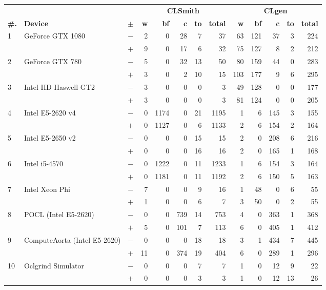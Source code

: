 \begin{tabular}{lll | rrrrr | rrrrr }
  \toprule
  & & & \multicolumn{5}{c|}{\textbf{CLSmith}} & \multicolumn{5}{c}{\textbf{CLgen}} \\
  \textbf{\#.} & \textbf{Device} & $\pm$ &
  \textbf{w} & \textbf{bf} & \textbf{c} & \textbf{to} & \textbf{total} &
  \textbf{w} & \textbf{bf} & \textbf{c} & \textbf{to} & \textbf{total} \\
  \midrule
  \multirow{ 2}{*}{1} & \multirow{ 2}{*}{GeForce GTX 1080} & $-$ & 2 & 0 & 28 & 7 & 37       & 63 & 121 & 37 & 3 & 224 \\& & $+$ & 9 & 0 & 17 & 6 & 32 & 75 & 127 & 8 & 2 & 212 \\
\hline
\multirow{ 2}{*}{2} & \multirow{ 2}{*}{GeForce GTX 780} & $-$ & 5 & 0 & 32 & 13 & 50       & 80 & 159 & 44 & 0 & 283 \\& & $+$ & 3 & 0 & 2 & 10 & 15 & 103 & 177 & 9 & 6 & 295 \\
\hline
\multirow{ 2}{*}{3} & \multirow{ 2}{*}{Intel HD Haswell GT2} & $-$ & 3 & 0 & 0 & 0 & 3       & 49 & 128 & 0 & 0 & 177 \\& & $+$ & 3 & 0 & 0 & 0 & 3 & 81 & 124 & 0 & 0 & 205 \\
\hline
\multirow{ 2}{*}{4} & \multirow{ 2}{*}{Intel E5-2620 v4} & $-$ & 0 & 1174 & 0 & 21 & 1195       & 1 & 6 & 145 & 3 & 155 \\& & $+$ & 0 & 1127 & 0 & 6 & 1133 & 2 & 6 & 154 & 2 & 164 \\
\hline
\multirow{ 2}{*}{5} & \multirow{ 2}{*}{Intel E5-2650 v2} & $-$ & 0 & 0 & 0 & 15 & 15       & 2 & 0 & 208 & 6 & 216 \\& & $+$ & 0 & 0 & 0 & 16 & 16 & 2 & 0 & 165 & 1 & 168 \\
\hline
\multirow{ 2}{*}{6} & \multirow{ 2}{*}{Intel i5-4570} & $-$ & 0 & 1222 & 0 & 11 & 1233       & 1 & 6 & 154 & 3 & 164 \\& & $+$ & 0 & 1181 & 0 & 11 & 1192 & 2 & 6 & 150 & 5 & 163 \\
\hline
\multirow{ 2}{*}{7} & \multirow{ 2}{*}{Intel Xeon Phi} & $-$ & 7 & 0 & 0 & 9 & 16       & 1 & 48 & 0 & 6 & 55 \\& & $+$ & 1 & 0 & 0 & 6 & 7 & 3 & 50 & 0 & 2 & 55 \\
\hline
\multirow{ 2}{*}{8} & \multirow{ 2}{*}{POCL (Intel E5-2620)} & $-$ & 0 & 0 & 739 & 14 & 753       & 4 & 0 & 363 & 1 & 368 \\& & $+$ & 5 & 0 & 101 & 7 & 113 & 6 & 0 & 405 & 1 & 412 \\
\hline
\multirow{ 2}{*}{9} & \multirow{ 2}{*}{ComputeAorta (Intel E5-2620)} & $-$ & 0 & 0 & 0 & 18 & 18       & 3 & 1 & 434 & 7 & 445 \\& & $+$ & 11 & 0 & 374 & 19 & 404 & 6 & 0 & 289 & 1 & 296 \\
\hline
\multirow{ 2}{*}{10} & \multirow{ 2}{*}{Oclgrind Simulator} & $-$ & 0 & 0 & 0 & 7 & 7       & 1 & 0 & 12 & 9 & 22 \\& & $+$ & 0 & 0 & 0 & 3 & 3 & 1 & 0 & 12 & 13 & 26 \\
  \bottomrule
\end{tabular}

